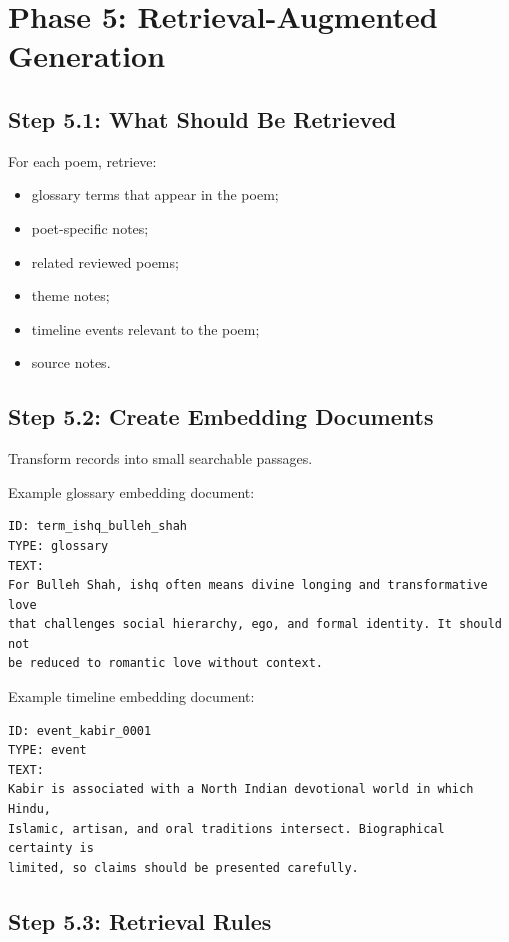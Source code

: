 \documentclass[11pt]{article}
\begin{document}
\section{Phase 5: Retrieval-Augmented Generation}

\subsection{Step 5.1: What Should Be Retrieved}

For each poem, retrieve:

\begin{itemize}
  \item glossary terms that appear in the poem;
  \item poet-specific notes;
  \item related reviewed poems;
  \item theme notes;
  \item timeline events relevant to the poem;
  \item source notes.
\end{itemize}

\subsection{Step 5.2: Create Embedding Documents}

Transform records into small searchable passages.

Example glossary embedding document:

\begin{verbatim}
ID: term_ishq_bulleh_shah
TYPE: glossary
TEXT:
For Bulleh Shah, ishq often means divine longing and transformative love
that challenges social hierarchy, ego, and formal identity. It should not
be reduced to romantic love without context.
\end{verbatim}

Example timeline embedding document:

\begin{verbatim}
ID: event_kabir_0001
TYPE: event
TEXT:
Kabir is associated with a North Indian devotional world in which Hindu,
Islamic, artisan, and oral traditions intersect. Biographical certainty is
limited, so claims should be presented carefully.
\end{verbatim}

\subsection{Step 5.3: Retrieval Rules}
\end{document}
